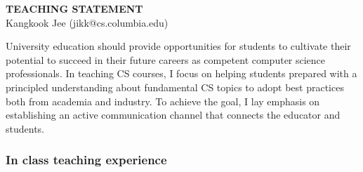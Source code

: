 \documentclass[letterpaper, 10pt]{article}
\begin{document}
\thispagestyle{fancy}

\lhead{}
\rhead{}

\renewcommand{\headrulewidth}{0pt} 
\renewcommand{\footrulewidth}{0pt} 

\fancyfoot[C]{\footnotesize
        \textcolor{gray}{http://www.cs.columbia.edu/$\sim$jikk/application}} 

\pagestyle{fancy}
\lhead{\textcolor{gray}{\it Kangkook Jee}}
\rhead{\textcolor{gray}{\thepage /\pageref{LastPage}}}

\begin{small}

\begin{center} {\LARGE \bf TEACHING STATEMENT}\\ \vspace*{0.1cm} {\normalsize
Kangkook Jee (jikk@cs.columbia.edu)} \end{center}
University education should provide opportunities for students to cultivate
their potential to succeed in their future careers as competent computer
science professionals.  
%
In teaching CS courses, I focus on helping students prepared with a principled
understanding about fundamental CS topics to adopt best practices both from
academia and industry.
%
To achieve the goal, I lay emphasis on establishing an active communication
channel that connects the educator and students.

\vspace{-2pt}
\subsubsection*{In class teaching experience}


\end{small}
\end{document}
